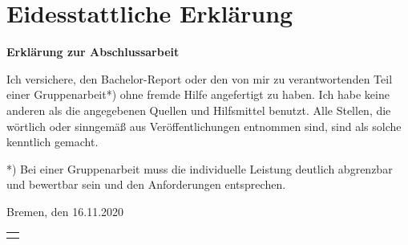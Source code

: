 \chapter{Eidesstattliche Erklärung}
\begin{flushleft}
\Large \textbf{Erklärung zur Abschlussarbeit}
\end{flushleft}


\vspace{1cm}

Ich versichere, den Bachelor-Report oder den von mir zu verantwortenden Teil einer
Gruppenarbeit*) ohne fremde Hilfe angefertigt zu haben. Ich habe keine anderen als
die angegebenen Quellen und Hilfsmittel benutzt. Alle Stellen, die wörtlich oder
sinngemäß aus Veröffentlichungen entnommen sind, sind als solche kenntlich
gemacht.

*) Bei einer Gruppenarbeit muss die individuelle Leistung deutlich abgrenzbar und
bewertbar sein und den Anforderungen entsprechen.
 
\vspace{1cm}

Bremen, den 16.11.2020

\vspace{2cm}

\begin{tabular}{@{}l@{}}\hline
	\makebox[6cm]{Hauke Tietjen}
\end{tabular}
